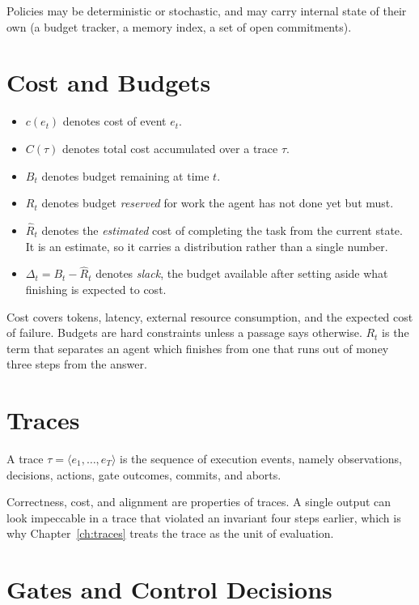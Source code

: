 Policies may be deterministic or stochastic, and may carry internal state of
their own (a budget tracker, a memory index, a set of open commitments).

\section*{Cost and Budgets}

\begin{itemize}
\item $c(e_t)$ denotes cost of event $e_t$.
\item $C(\tau)$ denotes total cost accumulated over a trace $\tau$.
\item $B_t$ denotes budget remaining at time $t$.
\item $R_t$ denotes budget \emph{reserved} for work the agent has not done yet but must.
\item $\hat{R}_t$ denotes the \emph{estimated} cost of completing the task from the
current state. It is an estimate, so it carries a distribution rather than a single number.
\item $\Delta_t = B_t - \hat{R}_t$ denotes \emph{slack}, the budget available after
setting aside what finishing is expected to cost.
\end{itemize}

Cost covers tokens, latency, external resource consumption, and the expected
cost of failure. Budgets are hard constraints unless a passage says otherwise.
$R_t$ is the term that separates an agent which finishes from one that runs out
of money three steps from the answer.

\section*{Traces}

A trace $\tau = \langle e_1, \ldots, e_T \rangle$ is the sequence of execution
events, namely observations, decisions, actions, gate outcomes, commits, and aborts.

Correctness, cost, and alignment are properties of traces. A single output can
look impeccable in a trace that violated an invariant four steps earlier, which
is why Chapter~\ref{ch:traces} treats the trace as the unit of evaluation.

\section*{Gates and Control Decisions}

